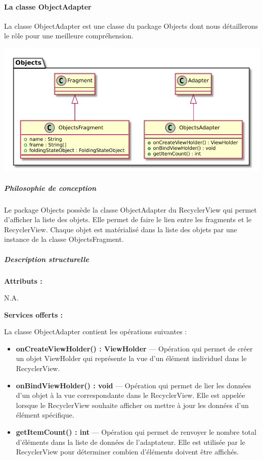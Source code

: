 \paragraph{La classe ObjectAdapter}

La classe ObjectAdapter est une classe du package Objects dont nous détaillerons le rôle pour une meilleure compréhension. 

\begin{minipage}
    {\linewidth}
    \centering
    \includegraphics[width=0.70\linewidth]{../schemas/Conception_detaillee/classe_objects.pdf}
\end{minipage}

\subparagraph{Philosophie de conception \newline} 

\medspace

Le package Objects possède la classe ObjectAdapter du RecyclerView qui permet d'afficher la liste des objets. Elle permet de faire le lien entre les fragments et le RecyclerView. 
Chaque objet est matérialisé dans la liste des objets par une instance de la classe ObjectsFragment. 

\subparagraph{Description structurelle \newline}

\medspace

\textbf{Attributs :}

N.A.

\textbf{Services offerts :}

La classe ObjectAdapter contient les opérations suivantes : 

\begin{itemize}
    \item \textbf{onCreateViewHolder() : ViewHolder} --- Opération qui permet de créer un objet ViewHolder qui représente la vue d'un élément individuel dans le RecyclerView. 
    \item \textbf{onBindViewHolder() : void} --- Opération qui permet de lier les données d'un objet à la vue correspondante dans le RecyclerView. Elle est appelée lorsque le RecyclerView souhaite afficher ou mettre à jour les données d'un élément spécifique. 
    \item \textbf{getItemCount() : int} --- Opération qui permet de renvoyer le nombre total d'éléments dans la liste de données de l'adaptateur. Elle est utilisée par le RecyclerView pour déterminer combien d'éléments doivent être affichés.
\end{itemize}


